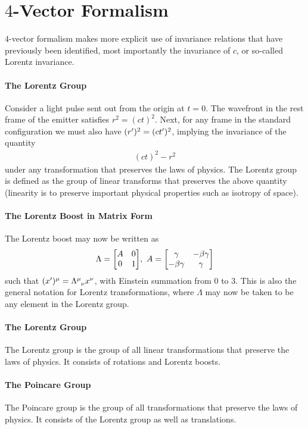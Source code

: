 \section{$4$-Vector Formalism}

$4$-vector formalism makes more explicit use of invariance relations that have previously been identified, most importantly the invariance of $c$, or so-called Lorentz invariance.

\paragraph{The Lorentz Group}
Consider a light pulse sent out from the origin at $t = 0$. The wavefront in the rest frame of the emitter satisfies $r^{2} = (ct)^{2}$. Next, for any frame in the standard configuration we must also have $(r^{\prime})^{2} = (ct^{\prime})^{2}$, implying the invariance of the quantity
\begin{align*}
	(ct)^{2} - r^{2}
\end{align*}
under any transformation that preserves the laws of physics. The Lorentz group is defined as the group of linear transforms that preserves the above quantity (linearity is to preserve important physical properties such as isotropy of space).

\paragraph{The Lorentz Boost in Matrix Form}
The Lorentz boost may now be written as
\begin{align*}
	\Lambda =
	\mqty[
		A & 0 \\
		0 & 1
	],\ 
	A =
	\mqty[
		\gamma       & -\beta\gamma \\
		-\beta\gamma & \gamma
	]
\end{align*}
such that $(x\p)^{\mu} = \tensor{\Lambda}{^{\mu}_{\nu}}x^{\nu}$, with Einstein summation from $0$ to $3$. This is also the general notation for Lorentz transformations, where $\Lambda$ may now be taken to be any element in the Lorentz group.

\paragraph{The Lorentz Group}
The Lorentz group is the group of all linear transformations that preserve the laws of physics. It consists of rotations and Lorentz boosts.

\paragraph{The Poincare Group}
The Poincare group is the group of all transformations that preserve the laws of physics. It consists of the Lorentz group as well as translations.

